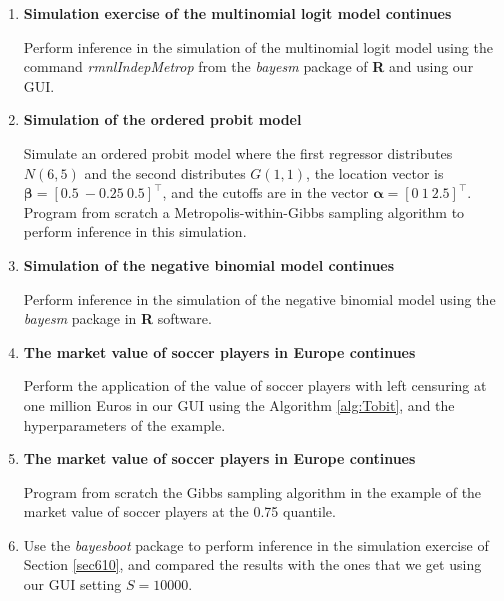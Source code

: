 \begin{enumerate}
	
	\item \textbf{Simulation exercise of the multinomial logit model continues}
	
	Perform inference in the simulation of the multinomial logit model using the command \textit{rmnlIndepMetrop} from the \textit{bayesm} package of \textbf{R} and using our GUI.
	
	\item \textbf{Simulation of the ordered probit model}
	
	Simulate an ordered probit model where the first regressor distributes $N(6, 5)$ and the second distributes $G(1,1)$, the location vector is $\bm{\beta}=\left[0.5 \ -0.25 \ 0.5\right]^{\top}$, and the cutoffs are in the vector $\bm{\alpha}=\left[0 \ 1 \ 2.5\right]^{\top}$. Program from scratch a Metropolis-within-Gibbs sampling algorithm to perform inference in this simulation.
	
	\item \textbf{Simulation of the negative binomial model continues}
	
	Perform inference in the simulation of the negative binomial model using the \textit{bayesm} package in \textbf{R} software.
	
	\item \textbf{The market value of soccer players in Europe continues}
	
	Perform the application of the value of soccer players with left censuring at one million Euros in our GUI using the Algorithm \ref{alg:Tobit}, and the hyperparameters of the example.
	
	\item \textbf{The market value of soccer players in Europe continues}
	
	Program from scratch the Gibbs sampling algorithm in the example of the market value of soccer players at the 0.75 quantile.
	
	\item Use the \textit{bayesboot} package to perform inference in the simulation exercise of Section \ref{sec610}, and compared the results with the ones that we get using our GUI setting $S=10000$.    

\end{enumerate}
